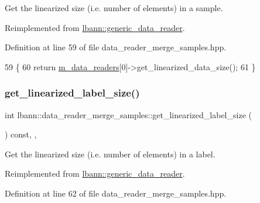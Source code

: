 Get the linearized size (i.\+e. number of elements) in a sample. 



Reimplemented from \hyperlink{classlbann_1_1generic__data__reader_a246a719477c8c7b6122d41b6f5618d41}{lbann\+::generic\+\_\+data\+\_\+reader}.



Definition at line 59 of file data\+\_\+reader\+\_\+merge\+\_\+samples.\+hpp.


\begin{DoxyCode}
59                                                 \{
60     \textcolor{keywordflow}{return} \hyperlink{classlbann_1_1generic__compound__data__reader_a9815e94ade5873415fd766e09d956d5b}{m\_data\_readers}[0]->get\_linearized\_data\_size();
61   \}
\end{DoxyCode}
\mbox{\label{classlbann_1_1data__reader__merge__samples_a880da359d18f4ae06ec50adf3b71219f}} 
\subsubsection{\texorpdfstring{get\+\_\+linearized\+\_\+label\+\_\+size()}{get\_linearized\_label\_size()}}
{\footnotesize\ttfamily int lbann\+::data\+\_\+reader\+\_\+merge\+\_\+samples\+::get\+\_\+linearized\+\_\+label\+\_\+size (\begin{DoxyParamCaption}{ }\end{DoxyParamCaption}) const\hspace{0.3cm}{\ttfamily [inline]}, {\ttfamily [override]}, {\ttfamily [virtual]}}



Get the linearized size (i.\+e. number of elements) in a label. 



Reimplemented from \hyperlink{classlbann_1_1generic__data__reader_a99e8ba4f09fdc86d238ad7c8d2e2bce0}{lbann\+::generic\+\_\+data\+\_\+reader}.



Definition at line 62 of file data\+\_\+reader\+\_\+merge\+\_\+samples.\+hpp.


